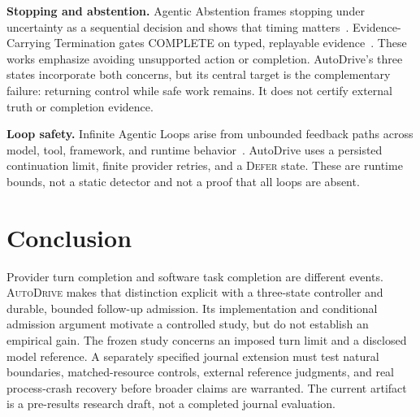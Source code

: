 \documentclass[sigconf,nonacm]{acmart}
\newcommand{\system}{\textsc{AutoDrive}}
\newcommand{\deferaction}{\textsc{Defer}}
\begin{document}
\textbf{Stopping and abstention.} Agentic Abstention frames stopping under uncertainty as a sequential decision and shows that timing matters~\cite{luo2026abstention}. Evidence-Carrying Termination gates COMPLETE on typed, replayable evidence~\cite{liu2026ect}. These works emphasize avoiding unsupported action or completion. AutoDrive's three states incorporate both concerns, but its central target is the complementary failure: returning control while safe work remains. It does not certify external truth or completion evidence.

\textbf{Loop safety.} Infinite Agentic Loops arise from unbounded feedback paths across model, tool, framework, and runtime behavior~\cite{hou2026loops}. AutoDrive uses a persisted continuation limit, finite provider retries, and a \deferaction{} state. These are runtime bounds, not a static detector and not a proof that all loops are absent.

\section{Conclusion}

Provider turn completion and software task completion are different events. \system{} makes that distinction explicit with a three-state controller and durable, bounded follow-up admission. Its implementation and conditional admission argument motivate a controlled study, but do not establish an empirical gain. The frozen study concerns an imposed turn limit and a disclosed model reference. A separately specified journal extension must test natural boundaries, matched-resource controls, external reference judgments, and real process-crash recovery before broader claims are warranted. The current artifact is a pre-results research draft, not a completed journal evaluation.




\appendix

\end{document}
